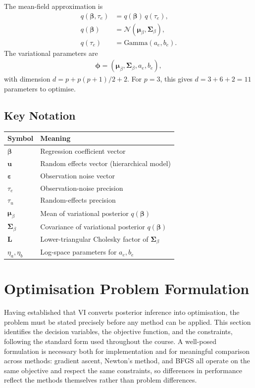 \documentclass[11pt,a4paper]{article}
\newcommand{\N}{\mathcal{N}}
\begin{document}
The mean-field approximation is
\begin{align}
q(\bm{\beta}, \tau_e) &= q(\bm{\beta})\,q(\tau_e),\\
q(\bm{\beta}) &= \N(\bm{\mu}_\beta, \bm{\Sigma}_\beta),\\
q(\tau_e) &= \text{Gamma}(a_e, b_e).
\end{align}
The variational parameters are
\begin{align}
\bm{\phi} = (\bm{\mu}_\beta,\bm{\Sigma}_\beta,a_e,b_e),
\end{align}
with dimension $d=p+p(p+1)/2+2$. For $p=3$, this gives $d=3+6+2=11$ parameters to optimise.

\subsection{Key Notation}

\begin{center}
\begin{tabular}{ll}
\hline
Symbol & Meaning \\
\hline
$\bm{\beta}$ & Regression coefficient vector \\
$\bm{u}$ & Random effects vector (hierarchical model) \\
$\bm{\varepsilon}$ & Observation noise vector \\
$\tau_e$ & Observation-noise precision \\
$\tau_u$ & Random-effects precision \\
$\bm{\mu}_\beta$ & Mean of variational posterior $q(\bm{\beta})$ \\
$\bm{\Sigma}_\beta$ & Covariance of variational posterior $q(\bm{\beta})$ \\
$\bm{L}$ & Lower-triangular Cholesky factor of $\bm{\Sigma}_\beta$ \\
$\eta_a, \eta_b$ & Log-space parameters for $a_e, b_e$ \\
\hline
\end{tabular}
\end{center}
\section{Optimisation Problem Formulation}

Having established that VI converts posterior inference into optimisation, the problem must be stated precisely before any method can be applied. This section identifies the decision variables, the objective function, and the constraints, following the standard form used throughout the course. A well-posed formulation is necessary both for implementation and for meaningful comparison across methods: gradient ascent, Newton's method, and BFGS all operate on the same objective and respect the same constraints, so differences in performance reflect the methods themselves rather than problem differences.
\end{document}

